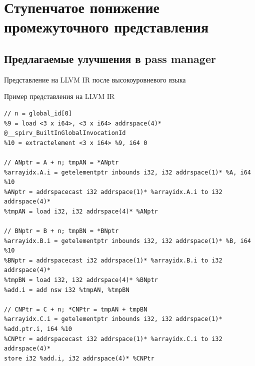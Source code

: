 \chapter{Ступенчатое понижение промежуточного представления}\label{ch:lowering}

\section{Предлагаемые улучшения в pass manager}\label{sec:lowering/passes}

Представление на LLVM IR после высокоуровневого языка

\begin{ListingEnv}[!h]
    \captiondelim{ } 
    \caption{Пример представления на LLVM IR}\label{lst:lowering/irrep}
    \begin{verbatim}
// n = global_id[0]
%9 = load <3 x i64>, <3 x i64> addrspace(4)* @__spirv_BuiltInGlobalInvocationId
%10 = extractelement <3 x i64> %9, i64 0

// ANptr = A + n; tmpAN = *ANptr
%arrayidx.A.i = getelementptr inbounds i32, i32 addrspace(1)* %A, i64 %10
%ANptr = addrspacecast i32 addrspace(1)* %arrayidx.A.i to i32 addrspace(4)*
%tmpAN = load i32, i32 addrspace(4)* %ANptr

// BNptr = B + n; tmpBN = *BNptr
%arrayidx.B.i = getelementptr inbounds i32, i32 addrspace(1)* %B, i64 %10
%BNptr = addrspacecast i32 addrspace(1)* %arrayidx.B.i to i32 addrspace(4)*
%tmpBN = load i32, i32 addrspace(4)* %BNptr
%add.i = add nsw i32 %tmpAN, %tmpBN

// CNPtr = C + n; *CNPtr = tmpAN + tmpBN
%arrayidx.C.i = getelementptr inbounds i32, i32 addrspace(1)* %add.ptr.i, i64 %10
%CNPtr = addrspacecast i32 addrspace(1)* %arrayidx.C.i to i32 addrspace(4)*
store i32 %add.i, i32 addrspace(4)* %CNPtr
    \end{verbatim}
\end{ListingEnv}


